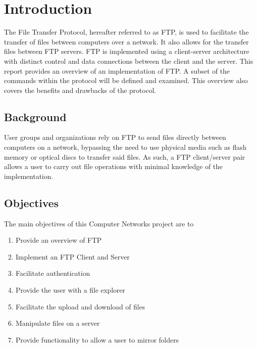 \chapter{Introduction}
The File Transfer Protocol, hereafter referred to as FTP, is used to
facilitate the transfer of files between computers over a network. It also
allows for the transfer files between FTP servers.
FTP is implemented using a client-server architecture with distinct control
and data connections between the client and the server. This report provides an
overview of an implementation of FTP. A subset of the commands within the protocol
will be defined and examined. This overview also covers the benefits and drawbacks
of the protocol.


\section{Background}
User groups and organizations rely on FTP to send files directly between computers on a network,
bypassing the need to use physical media such as flash memory or optical discs to transfer said files.
As such, a FTP client/server pair allows a user to carry out file operations with minimal knowledge of the implementation.

\newpage

\section{Objectives}
The main objectives of this Computer Networks project are to
\begin{enumerate}
\item Provide an overview of FTP
\item Implement an FTP Client and Server
\item Facilitate authentication
\item Provide the user with a file explorer
\item Facilitate the upload and download of files
\item Manipulate files on a server
\item Provide functionality to allow a user to mirror folders
\end{enumerate}

